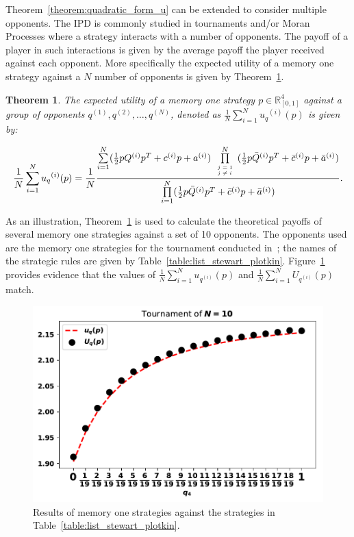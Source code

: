\documentclass[10pt]{article}
\newtheorem{theorem}{Theorem}
\begin{document}
Theorem~\ref{theorem:quadratic_form_u} can be extended to consider multiple
opponents. The IPD is commonly studied in tournaments and/or Moran Processes
where a strategy interacts with a number of opponents. The payoff of a player in
such interactions is given by the average payoff the player received against
each opponent. More specifically the expected utility of a memory one strategy
against a \(N\) number of opponents is given by
Theorem~\ref{theorem:tournament_utility}.

\begin{theorem}\label{theorem:tournament_utility}
    The expected utility of a memory one strategy \(p\in\mathbb{R}_{[0,1]}^4\)
    against a group of opponents \(q^{(1)}, q^{(2)}, \dots, q^{(N)}\), denoted
    as \(\frac{1}{N} \sum\limits_{i=1} ^ {N} {u_q}^{(i)} (p)\) is given by:

    \begin{equation}\label{eq:tournament_utility}
        \frac{1}{N} \sum\limits_{i=1} ^ {N} {u_q}^{(i)} (p) = \frac{1}{N}
        \frac{\sum\limits_{i=1} ^ {N} (\frac{1}{2} pQ^{(i)} p^T + c^{(i)} p + a^ {(i)})
        \prod\limits_{\tiny\begin{array}{l} j=1 \\ j \neq i \end{array}} ^
        N (\frac{1}{2} p\bar{Q}^{(i)} p^T + \bar{c}^{(i)} p + \bar{a}^ {(i)})}
        {\prod\limits_{i=1} ^ N (\frac{1}{2} p\bar{Q}^{(i)} p^T + \bar{c}^{(i)} p + \bar{a}^ {(i)})}.
    \end{equation}
\end{theorem}

As an illustration, Theorem~\ref{theorem:tournament_utility} is used to
calculate the theoretical payoffs of several memory one strategies against a set
of 10 opponents. The opponents used are the memory one strategies for the
tournament conducted in~\cite{Stewart2012}; the names of the strategic rules are
given by Table~\ref{table:list_stewart_plotkin}.
Figure~\ref{fig:stewart_plotkin_results} provides evidence that the values of
\(\frac{1}{N} \sum\limits_{i=1} ^ {N} u_{q ^{(i)}} (p)\) and \(\frac{1}{N}
\sum\limits_{i=1} ^ {N} U_{q ^{(i)}} (p)\) match.



\begin{figure}[!htbp]
    \begin{center}
    \includegraphics[width=.5\linewidth]{img/Stewart_tournament_results.pdf}
    \caption{Results of memory one strategies against the strategies in
    Table~\ref{table:list_stewart_plotkin}.}
    \label{fig:stewart_plotkin_results}
    \end{center}
\end{figure}
\end{document}
